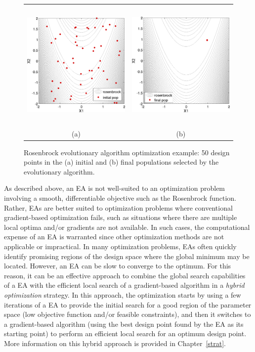 \begin{figure}[hbt!]
  \centering
  \begin{tabular}{cc}
  \includegraphics[height=2.5in]{images/rosen_ea_init} &
  \includegraphics[height=2.5in]{images/rosen_ea_final} \\
  (a) & (b)
  \end{tabular}
  \caption{Rosenbrock evolutionary algorithm optimization example: 50
    design points in the (a) initial and (b) final populations
    selected by the evolutionary algorithm. }
  \label{tutorial:rosenbrock_ea_graphics}
\end{figure}

As described above, an EA is not well-suited to an optimization
problem involving a smooth, differentiable objective such as the
Rosenbrock function. Rather, EAs are better suited to optimization
problems where conventional gradient-based optimization fails, such as
situations where there are multiple local optima and/or gradients are
not available. In such cases, the computational expense of an EA is
warranted since other optimization methods are not applicable or
impractical. In many optimization problems, EAs often quickly identify
promising regions of the design space where the global minimum may be
located. However, an EA can be slow to converge to the optimum. For
this reason, it can be an effective approach to combine the global
search capabilities of a EA with the efficient local search of a
gradient-based algorithm in a \emph{hybrid optimization} strategy.  In
this approach, the optimization starts by using a few iterations of a
EA to provide the initial search for a good region of the parameter
space (low objective function and/or feasible constraints), and then
it switches to a gradient-based algorithm (using the best design point
found by the EA as its starting point) to perform an efficient local
search for an optimum design point. More information on this hybrid
approach is provided in Chapter~\ref{strat}.

